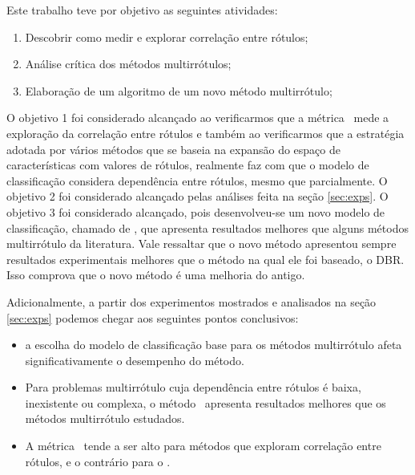 Este trabalho teve por objetivo as seguintes atividades:
\begin{enumerate}
 \item Descobrir como medir e explorar correlação entre rótulos;
 \item Análise crítica dos métodos multirrótulos;
 \item Elaboração de um algoritmo de um novo método multirrótulo;
\end{enumerate}
O objetivo 1 foi considerado alcançado ao verificarmos que a métrica \SA~mede a 
exploração da correlação entre rótulos e também ao verificarmos que a estratégia adotada por vários 
métodos que se baseia na expansão do espaço de características com valores de rótulos, realmente
faz com que o modelo de classificação considera dependência entre rótulos, mesmo que parcialmente.
O objetivo 2 foi considerado alcançado pelas análises feita na seção \ref{sec:exps}.
O objetivo 3 foi considerado alcançado, pois desenvolveu-se um novo modelo de classificação,
chamado de \MRLM, que apresenta resultados melhores que alguns métodos multirrótulo da literatura.
Vale ressaltar que o novo método apresentou sempre resultados experimentais melhores que o método na qual
ele foi baseado, o DBR. Isso comprova que o novo método é uma melhoria do antigo.

Adicionalmente, a partir dos experimentos mostrados e analisados na seção \ref{sec:exps} podemos
chegar aos seguintes pontos conclusivos:
  \begin{itemize}
   \item a escolha do modelo de classificação base para os métodos multirrótulo
   afeta significativamente o desempenho do método.
   \item Para problemas multirrótulo cuja dependência entre rótulos é baixa, inexistente ou complexa, o
   método \BR~apresenta resultados melhores que os métodos multirrótulo estudados.
   \item A métrica \SA~tende a ser alto para métodos que exploram correlação entre rótulos, e o contrário
   para o \HL.
  \end{itemize}


  

